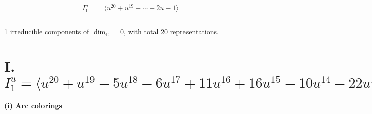 \documentclass[1p]{elsarticle_modified}
\theoremstyle{definition}
\begin{document}
\begin{align*}
I^u_{1}&=\langle 
u^{20}+u^{19}+\cdots-2 u-1\rangle \\
\\
\end{align*}
\raggedright * 1 irreducible components of $\dim_{\mathbb{C}}=0$, with total 20 representations.\\
\newpage
\renewcommand{\arraystretch}{1}
\centering \section*{I. $I^u_{1}= \langle u^{20}+u^{19}-5 u^{18}-6 u^{17}+11 u^{16}+16 u^{15}-10 u^{14}-22 u^{13}-2 u^{12}+13 u^{11}+13 u^{10}+4 u^9-9 u^8-10 u^7+4 u^5+3 u^4+u^3- u^2-2 u-1 \rangle$}
\flushleft \textbf{(i) Arc colorings}\\
\end{document}
